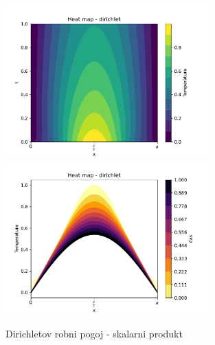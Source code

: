\newpage
\begin{figure}[h]
    \centering
    \includegraphics[width=0.7\textwidth]{pdfs/heat_map_direchlet.pdf}
    \includegraphics[width=0.7\textwidth]{pdfs/heat_map2_direchlet.pdf}
    \caption{Dirichletov robni pogoj - skalarni produkt}
\end{figure}

